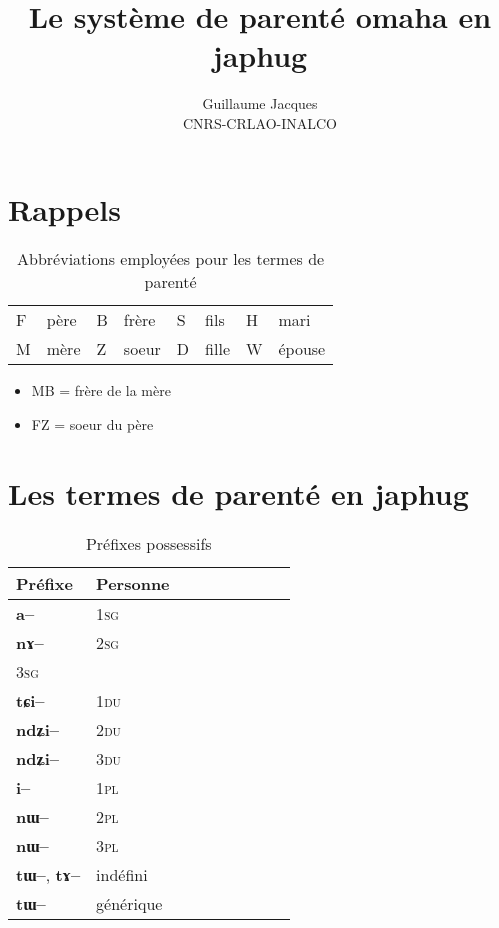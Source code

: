 \documentclass[oneside,a4paper,11pt]{article}
\newcommand{\ipa}[1]{{\phon\textbf{#1}}}
\begin{document}
 
\title{Le système de parenté omaha en japhug}
\author{Guillaume Jacques\\ CNRS-CRLAO-INALCO}
\maketitle

\section{Rappels}
\begin{table}[H]
\caption{Abbréviations employées pour les termes de parenté} \centering
\begin{tabular}{ll|ll|ll|ll}
\toprule
F & père & B & frère & S & fils & H & mari \\
M & mère & Z & soeur & D & fille & W & épouse \\
\bottomrule
\end{tabular}
\end{table}
\begin{itemize}
\item MB = frère de la mère
\item FZ = soeur du père
\end{itemize}
\section{Les termes de parenté en japhug}
\begin{table}[H] \centering
\caption{Préfixes possessifs } 
\begin{tabular}{lllllllll} 
\toprule
 Préfixe & Personne\\
\midrule
	\ipa{a--}  &		1\textsc{sg} \\
	\ipa{nɤ--}  &			2\textsc{sg}\\
		3\textsc{sg}\\
\midrule
\ipa{tɕi--}  &			1\textsc{du} \\
	\ipa{ndʑi--}  &		2\textsc{du} \\	
\ipa{ndʑi--}  &		3\textsc{du} \\	
\midrule
	\ipa{i--}  &			1\textsc{pl} \\
	\ipa{nɯ--}  &			2\textsc{pl} \\
	\ipa{nɯ--}  &			3\textsc{pl} \\
\midrule
  \ipa{tɯ--},  \ipa{tɤ--} & indéfini \\
  \ipa{tɯ--}   &  générique \\
\bottomrule
\end{tabular}
\end{table}
\end{document}
